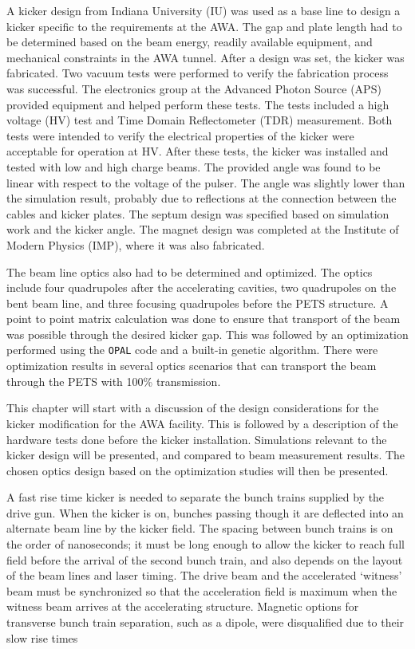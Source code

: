 A kicker design from Indiana University (IU) was used as a base line to design a kicker specific to the
requirements at the AWA. The gap and plate length had to be determined based on the beam energy, 
readily available equipment, and mechanical constraints in the AWA tunnel. 
After a design was set, the kicker was fabricated.
Two vacuum tests were performed to verify the fabrication process was successful.
The electronics group at the Advanced Photon Source (APS) provided equipment and helped perform these tests.
The tests included a high voltage (HV) test and Time Domain Reflectometer (TDR) measurement.
Both tests were intended to verify the electrical properties of the kicker were acceptable for operation at HV.
After these tests, the kicker was installed and tested with low and high charge beams. 
The provided angle was found to be linear with respect to the voltage of the pulser.  
The angle was slightly lower than the simulation result, probably due to reflections at the
connection between the cables and kicker plates. 
The septum design was specified based on simulation work and the kicker angle.
The magnet design was completed at the Institute of Modern Physics (IMP), 
where it was also fabricated. 

The beam line optics also had to be determined and optimized.
The optics include four quadrupoles after the accelerating cavities, 
two quadrupoles on the bent beam line, and three focusing quadrupoles
before the PETS structure.
A point to point matrix calculation was done to ensure that transport of the
beam was possible through the desired kicker gap.  This was followed by an optimization 
performed using the \verb|OPAL| code and a built-in genetic algorithm. 
There were optimization results in several optics scenarios that can transport 
the beam through the PETS with 100\% transmission.  

This chapter will start with a discussion of the design considerations for the kicker modification for the AWA facility.  
This is followed by a description of the hardware tests done before the kicker installation.  
Simulations relevant to the kicker design will be presented, and compared to beam measurement results.  
The chosen optics design based on the optimization studies will then be presented.


 \label{theory}

A fast rise time kicker is needed to separate the 
bunch trains supplied by the drive gun.  When the kicker is on, 
bunches passing though it are deflected into an alternate beam line by the kicker field.
The spacing between bunch trains is on the order of nanoseconds; 
it must be long enough to allow the kicker to reach full field before the arrival of the second bunch train, 
and also depends on the layout of the beam lines and laser timing.  
The drive beam and the accelerated `witness' beam must be synchronized so that the 
acceleration field is maximum when the witness beam arrives at the accelerating structure.
Magnetic options for transverse bunch train separation, 
such as a dipole, were disqualified due to their slow rise times 

